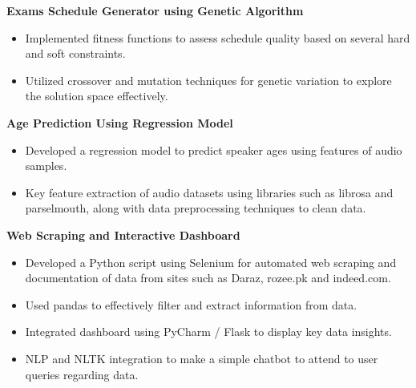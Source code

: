 \documentclass[a4paper,10pt]{article}
\begin{document}
\textbf{ Exams Schedule Generator using Genetic Algorithm }\\[-0.3em]
\begin{itemize}[leftmargin=1em, noitemsep, topsep=0pt, partopsep=0pt, parsep=0pt]

    \item Implemented fitness functions to assess schedule quality based on several hard and soft constraints.

    \item Utilized crossover and mutation techniques for genetic variation to explore the solution space effectively.

\end{itemize}\vspace{0.3em} %

\textbf{ Age Prediction Using Regression Model }\\[-0.3em]
\begin{itemize}[leftmargin=1em, noitemsep, topsep=0pt, partopsep=0pt, parsep=0pt]

    \item Developed a regression model to predict speaker ages using features of audio samples.

    \item Key feature extraction of audio datasets using libraries such as librosa and parselmouth, along with data preprocessing techniques to clean data.

\end{itemize}\vspace{0.3em} %

\textbf{ Web Scraping and Interactive Dashboard }\\[-0.3em]
\begin{itemize}[leftmargin=1em, noitemsep, topsep=0pt, partopsep=0pt, parsep=0pt]

    \item Developed a Python script using Selenium for automated web scraping and documentation of data from sites such as Daraz, rozee.pk and indeed.com.

    \item Used pandas to effectively filter and extract information from data.

    \item Integrated dashboard using PyCharm / Flask to display key data insights.

    \item NLP and NLTK integration to make a simple chatbot to attend to user queries regarding data.

\end{itemize}\vspace{0.3em} %
\end{document}
